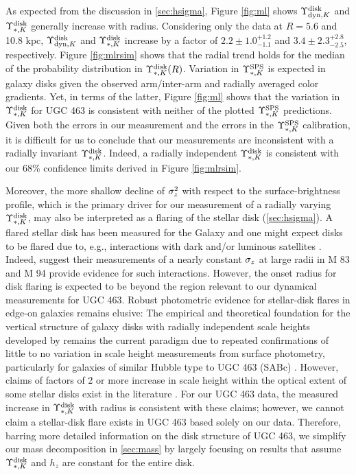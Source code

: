 \documentclass[apj,iop,numberedappendix]{emulateapj}
\begin{document}
As expected from the discussion in \sect \ref{sec:hsigma}, Figure \ref{fig:ml}
shows $\Upsilon_{{\rm dyn},K}^{\rm disk}$ and $\Upsilon_{\ast,K}^{\rm disk}$ generally increase with radius.  Considering
only the data at $R=5.6$ and 10.8 kpc, $\Upsilon_{{\rm dyn},K}^{\rm disk}$ and $\Upsilon_{\ast,K}^{\rm disk}$ increase by
a factor of $2.2\pm1.0^{+1.2}_{-1.1}$ and $3.4\pm2.3^{+2.8}_{-2.5}$,
respectively.  Figure \ref{fig:mlrsim} shows that the radial trend holds for the
median of the probability distribution in $\Upsilon_{\ast,K}^{\rm disk}(R)$.  Variation in
$\Upsilon_{\ast,K}^{\rm SPS}$ is expected in galaxy disks given the observed arm/inter-arm and
radially averaged color gradients.  Yet, in terms of the latter, Figure
\ref{fig:ml} shows that the variation in $\Upsilon_{\ast,K}^{\rm disk}$ for UGC 463 is consistent
with neither of the plotted $\Upsilon_{\ast,K}^{\rm SPS}$ predictions.  Given both the errors in
our measurement and the errors in the $\Upsilon_{\ast,K}^{\rm SPS}$ calibration, it is difficult
for us to conclude that our measurements are inconsistent with a radially
invariant $\Upsilon_{\ast,K}^{\rm disk}$.  Indeed, a radially independent $\Upsilon_{\ast,K}^{\rm disk}$ is consistent
with our 68\% confidence limits derived in Figure \ref{fig:mlrsim}.

Moreover, the more shallow decline of $\sigma_z^2$ with respect to the
surface-brightness profile, which is the primary driver for our measurement of a
radially varying $\Upsilon_{\ast,K}^{\rm disk}$, may also be interpreted as a flaring of the
stellar disk (\sect \ref{sec:hsigma}).  A flared stellar disk has been measured
for the Galaxy \citep{2002A&A...394..883L, 2003A&A...409..523R,
2006A&A...451..515M} and one might expect disks to be flared due to, e.g.,
interactions with dark and/or luminous satellites \citep{2006PASJ...58..835H,
2008ASPC..396..321D, 2008MNRAS.389.1041R, 2009ApJ...700.1896K}.  Indeed,
\citet{2009ApJ...693L..19H} suggest their measurements of a nearly constant
$\sigma_z$ at large radii in M 83 and M 94 provide evidence for such interactions.
However, the onset radius for disk flaring is expected to be beyond the region
relevant to our dynamical measurements for UGC 463.  Robust photometric evidence
for stellar-disk flares in edge-on galaxies remains elusive:  The empirical and
theoretical foundation for the vertical structure of galaxy disks with radially
independent scale heights developed by \citet{1981A&A....95..105V,
1981A&A....95..116V, 1982A&A...110...61V, 1982A&A...110...79V} remains the
current paradigm due to repeated confirmations of little to no variation in
scale height measurements from surface photometry, particularly for galaxies of
similar Hubble type to UGC 463 (SABc) \citep[e.g.,][]{1997A&A...320L..21D,
2002A&A...389..795B}.  However, claims of factors of 2 or more increase in scale
height within the optical extent of some stellar disks exist in the literature
\citep[e.g.,][]{2002A&A...390L..35N, 2009MNRAS.396..409S}.  For our UGC 463
data, the measured increase in $\Upsilon_{\ast,K}^{\rm disk}$ with radius is consistent with these
claims; however, we cannot claim a stellar-disk flare exists in UGC 463 based
solely on our data.  Therefore, barring more detailed information on the disk
structure of UGC 463, we simplify our mass decomposition in \sect \ref{sec:mass}
by largely focusing on results that assume $\Upsilon_{\ast,K}^{\rm disk}$ and $h_z$ are constant
for the entire disk.
\end{document}
